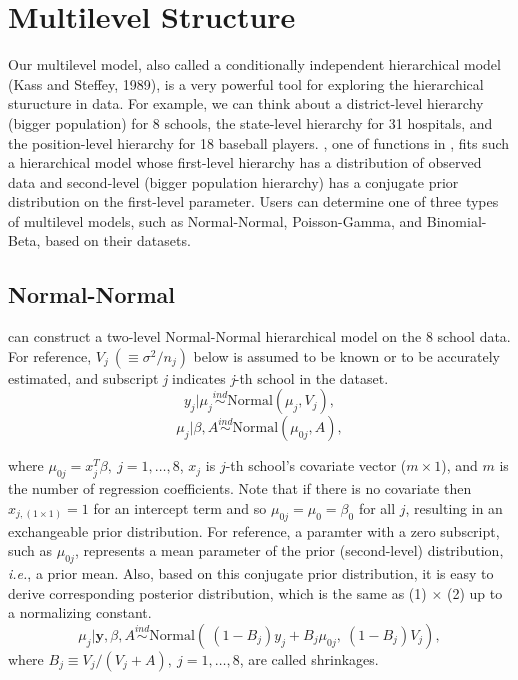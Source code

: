 \documentclass[article]{jss}
\begin{document}
\section[Multilevel Structure]{Multilevel Structure}
Our multilevel model, also called a conditionally independent hierarchical model (Kass and Steffey, 1989), is a very powerful tool for exploring the hierarchical sturucture in data. For example, we can think about a district-level hierarchy (bigger population) for 8 schools, the state-level hierarchy for 31 hospitals, and the position-level hierarchy for 18 baseball players. , one of functions in , fits such a hierarchical model whose first-level hierarchy has a distribution of observed data and second-level (bigger population hierarchy) has a conjugate prior distribution on the first-level parameter. Users can determine one of three types of multilevel models, such as Normal-Normal, Poisson-Gamma, and Binomial-Beta, based on their datasets. 
\\

 
\subsection[Normal-Normal]{Normal-Normal}
 can construct a two-level Normal-Normal hierarchical model on the 8 school data. For reference,  $V_{j}~(\equiv \sigma^{2}/n_{j})$ below is assumed to be known or to be accurately estimated, and subscript \emph{j} indicates \emph{j}-th school in the dataset.
\begin{equation}
y_{j}\vert \mu_{j} \stackrel{ind}{\sim}\textrm{Normal}(\mu_{j}, V_{j}),
\end{equation}
\begin{equation}
\mu_{j}\vert \beta, A\stackrel{ind}{\sim}\textrm{Normal}(\mu_{0j}, A),
\end{equation}

where $\mu_{0j} =x^{T}_{j}\beta,~j=1, \ldots, 8$, $x_{j}$ is $j$-th school's covariate vector ($m\times 1$), and $m$ is the number of regression coefficients. Note that if there is no covariate then $x_{j, (1\times1)}=1$ for an intercept term and so $\mu_{0j}=\mu_{0}=\beta_{0}$ for all $j$, resulting in an exchangeable prior distribution. For reference, a paramter with a zero subscript, such as $\mu_{0j}$, represents a mean parameter of the prior (second-level) distribution, \emph{i.e.}, a prior mean. Also,  based on this conjugate prior distribution, it is easy to derive corresponding posterior distribution, which is the same as (1) $\times$ (2) up to a normalizing constant.
\begin{equation}
\mu_{j}\vert \textbf{y}, \beta, A \stackrel{ind}{\sim}\textrm{Normal}(~(1-B_{j})y_{j} + B_{j}\mu_{0j},~(1-B_{j})V_{j}),
\end{equation}
where $B_{j}\equiv V_{j}/(V_{j} + A),~j=1, \ldots, 8$, are called shrinkages.
\end{document}

